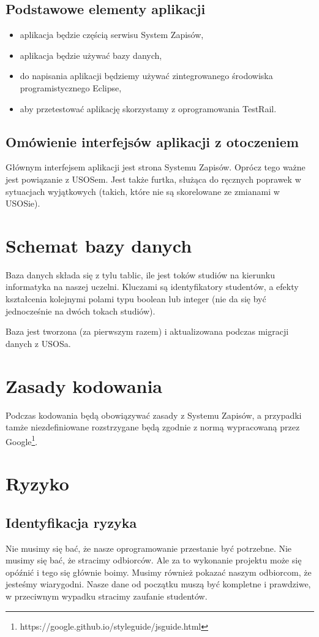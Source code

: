 \documentclass{article}
\begin{document}
\subsection{Podstawowe elementy aplikacji}
\begin{itemize}
 \item aplikacja będzie częścią serwisu System Zapisów,
 \item aplikacja będzie używać bazy danych,
 \item do napisania aplikacji będziemy używać zintegrowanego środowiska programistycznego Eclipse,
 \item aby przetestować aplikację skorzystamy z oprogramowania TestRail.
\end{itemize}

\subsection{Omówienie interfejsów aplikacji z otoczeniem}
Głównym interfejsem aplikacji jest strona Systemu Zapisów. Oprócz tego ważne jest powiązanie z USOSem. Jest także furtka, służąca do ręcznych poprawek w sytuacjach wyjątkowych (takich, które nie są skorelowane ze zmianami w USOSie).

\section{Schemat bazy danych}
Baza danych składa się z tylu tablic, ile jest toków studiów na kierunku informatyka na naszej uczelni. Kluczami są identyfikatory studentów, a efekty kształcenia kolejnymi polami typu boolean lub integer (nie da się być jednocześnie na dwóch tokach studiów).

Baza jest tworzona (za pierwszym razem) i aktualizowana podczas migracji danych z USOSa.

\section{Zasady kodowania}
Podczas kodowania będą obowiązywać zasady z Systemu Zapisów, a przypadki tamże niezdefiniowane rozstrzygane będą zgodnie z normą wypracowaną przez Google\footnote{https://google.github.io/styleguide/jsguide.html}.

\section{Ryzyko}

\subsection{Identyfikacja ryzyka}
Nie musimy się bać, że nasze oprogramowanie przestanie być potrzebne. Nie musimy się bać, że stracimy odbiorców. Ale za to wykonanie projektu może się opóźnić i tego się głównie boimy.
Musimy również pokazać naszym odbiorcom, że jesteśmy wiarygodni. Nasze dane od początku muszą być kompletne i prawdziwe, w przeciwnym wypadku stracimy zaufanie studentów.
\end{document}
